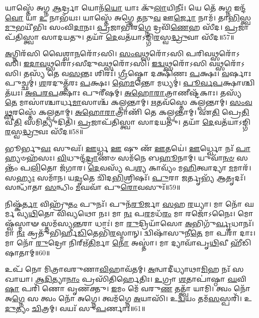𑌯𑌾𑌸𑍍𑌤𑍇᳴ 𑌅𑌗𑍍𑌨 \ul{𑌆}\-𑌰𑍍𑌦𑍍𑌰𑌾 𑌯𑍋𑌨᳴\-\ul{𑌯𑍋} 𑌯𑌾𑌃 𑌕𑍁᳴\-\ul{𑌲𑌾}\-𑌯𑌿𑌨𑍀𑌃॑। 
𑌯𑍇 𑌤𑍇᳴ 𑌅\-\ul{𑌗𑍍𑌨} 𑌇𑌨𑍍𑌦᳴\-\ul{𑌵𑍋} 𑌯𑌾 \ul{𑌉} 𑌨𑌾𑌭᳴𑌯𑌃। 
𑌯𑌾𑌸𑍍𑌤𑍇᳴ 𑌅𑌗𑍍𑌨𑍇 \ul{𑌤}\-𑌨𑍁\-\ul{𑌵} 𑌊\-\ul{𑌰𑍍𑌜𑍋} 𑌨𑌾𑌮᳴। 
𑌤𑌾\-\ul{𑌭𑌿}\-𑌸𑍍𑌤𑍍𑌵\-\ul{𑌮𑍁}\-𑌭𑌯𑍀᳴𑌭𑌿𑌃 𑌸𑌂𑌵𑌿\-\ul{𑌦𑌾}\-𑌨𑌃। 
\-\ul{𑌪𑍍𑌰}\-𑌜𑌾𑌭𑌿᳴𑌰\-\ul{𑌗𑍍𑌨𑍇} 𑌦𑍍𑌰𑌵𑌿᳴\-\ul{𑌣𑍇}\-𑌹 𑌸𑍀᳴𑌦। 
\-\ul{𑌪𑍍𑌰}\-𑌜𑌾𑌪᳴𑌤𑌿𑌸𑍍𑌤𑍍𑌵𑌾 𑌸𑌾𑌦𑌯𑌤𑍁। 
𑌤𑌯𑌾᳴ \ul{𑌦𑍇}\-𑌵𑌤᳴𑌯𑌾𑌽𑌙𑍍𑌗𑌿\-\ul{𑌰}\-𑌸𑍍𑌵\-\ul{𑌦𑍍𑌧𑍍𑌰𑍁}\-𑌵𑌾 𑌸𑍀᳴𑌦॥57॥
\anuvakamend

\-\ul{𑌅}\-𑌗𑍍𑌨𑌿𑌰᳴𑌸𑌿 𑌵𑍈𑌶𑍍𑌵𑌾\-\ul{𑌨}\-𑌰𑍋᳴𑌽𑌸𑌿। 
\-\ul{𑌸𑌂}\-\-\ul{𑌵}\-\-\ul{𑌥𑍍𑌸}\-𑌰𑍋᳴𑌽𑌸𑌿 𑌪𑌰𑌿𑌵\-\ul{𑌥𑍍𑌸}\-𑌰𑍋᳴𑌽𑌸𑌿। 
\-\ul{𑌇}\-\-\ul{𑌦𑌾}\-\-\ul{𑌵}\-\-\ul{𑌥𑍍𑌸}\-𑌰𑍋᳴𑌽𑌸𑍀𑌦𑍁𑌵\-\ul{𑌥𑍍𑌸}\-𑌰𑍋᳴𑌽𑌸𑌿। 
\-\ul{𑌇}\-\-\ul{𑌦𑍍𑌵}\-\-\ul{𑌥𑍍𑌸}\-𑌰𑍋᳴𑌽𑌸𑌿 𑌵\-\ul{𑌥𑍍𑌸}\-𑌰𑍋᳴𑌽𑌸𑌿। 
𑌤𑌸𑍍𑌯᳴ 𑌤𑍇 𑌵\-\ul{𑌸}\-𑌨𑍍𑌤𑌃  𑌶𑌿𑌰𑌃᳴। 
\-\ul{𑌗𑍍𑌰𑍀}\-𑌷𑍍𑌮𑍋 𑌦𑌕𑍍𑌷𑌿᳴𑌣𑌃 \ul{𑌪}\-𑌕𑍍𑌷𑌃। 
\-\ul{𑌵}\-𑌰𑍍\mbox{}𑌷𑌾𑌃 𑌪𑍁𑌚𑍍𑌛𑌮𑍍॑। 
\-\ul{𑌶}\-𑌰𑌦𑍁𑌤𑍍𑌤᳴𑌰𑌃 \ul{𑌪}\-𑌕𑍍𑌷𑌃। 
\-\ul{𑌹𑍇}\-\-\ul{𑌮}\-𑌨𑍍𑌤𑍋 𑌮𑌧𑍍𑌯𑌮𑍍॑। 
\-\ul{𑌪𑍂}\-\-\ul{𑌰𑍍𑌵}\-\-\ul{𑌪}\-𑌕𑍍𑌷𑌾𑌶𑍍𑌚𑌿𑌤᳴𑌯𑌃। 
\-\ul{𑌅}\-\-\ul{𑌪}\-\-\ul{𑌰}\-\-\ul{𑌪}\-𑌕𑍍𑌷𑌾𑌃 𑌪𑍁𑌰𑍀᳴𑌷𑌮𑍍। 
\-\ul{𑌅}\-\-\ul{𑌹𑍋}\-\-\ul{𑌰𑌾}\-𑌤𑍍𑌰𑌾𑌣𑍀𑌷𑍍𑌟᳴𑌕𑌾𑌃। 
𑌤𑌸𑍍𑌯᳴ \ul{𑌤𑍇} 𑌮𑌾𑌸𑌾॑𑌶𑍍𑌚𑌾𑌰𑍍𑌧\-\ul{𑌮𑌾}\-𑌸𑌾𑌶𑍍𑌚᳴ 𑌕𑌲𑍍𑌪𑌨𑍍𑌤𑌾𑌮𑍍। 
\-\ul{𑌋}\-𑌤𑌵᳴𑌸𑍍𑌤𑍇 𑌕𑌲𑍍𑌪𑌨𑍍𑌤𑌾𑌮𑍍। 
\-\ul{𑌸𑌂}\-\-\ul{𑌵}\-\-\ul{𑌥𑍍𑌸}\-𑌰𑌸𑍍𑌤𑍇᳴ 𑌕𑌲𑍍𑌪𑌤𑌾𑌮𑍍। 
\-\ul{𑌅}\-\-\ul{𑌹𑍋}\-\-\ul{𑌰𑌾}\-𑌤𑍍𑌰𑌾𑌣𑌿᳴ 𑌤𑍇 𑌕𑌲𑍍𑌪𑌨𑍍𑌤𑌾𑌮𑍍। 
𑌏\-\ul{𑌤𑌿} 𑌪𑍍𑌰𑍇\-\ul{𑌤𑌿} 𑌵𑍀\-\ul{𑌤𑌿} 𑌸𑌮𑌿𑌤𑍍𑌯𑍁𑌦𑌿𑌤𑌿᳴। 
\-\ul{𑌪𑍍𑌰}\-𑌜𑌾𑌪᳴𑌤𑌿𑌸𑍍𑌤𑍍𑌵𑌾 𑌸𑌾𑌦𑌯𑌤𑍁। 
𑌤𑌯𑌾᳴ \ul{𑌦𑍇}\-𑌵𑌤᳴𑌯𑌾𑌽𑌙𑍍𑌗𑌿\-\ul{𑌰}\-𑌸𑍍𑌵\-\ul{𑌦𑍍𑌧𑍍𑌰𑍁}\-𑌵𑌃 𑌸𑍀᳴𑌦॥58॥
\anuvakamend[𑌚𑌿𑌤᳴\-\ul{𑌯𑍋} 𑌨𑌵᳴ 𑌚]


𑌭𑍂𑌰𑍍𑌭𑍁\-\ul{𑌵𑌃} 𑌸𑍁𑌵𑌃᳴। 
\-\ul{𑌊}\-𑌰𑍍𑌧𑍍𑌵 \ul{𑌊} 𑌷𑍁 𑌣᳴ \ul{𑌊}\-𑌤𑌯𑍇॑। 
\-\ul{𑌊}\-𑌰𑍍𑌧𑍍𑌵𑍋 𑌨𑌃᳴ \ul{𑌪𑌾}\-𑌹𑍍𑌯𑍞𑌹᳴𑌸𑌃। 
\-\ul{𑌵𑌿}\-𑌧𑍁𑌨𑍍𑌦᳴\-\ul{𑌦𑍍𑌰𑌾}\-𑌣𑍞 𑌸𑌮᳴𑌨𑍇 𑌬\-\ul{𑌹𑍂}\-𑌨𑌾𑌮𑍍। 
𑌯𑍁𑌵𑌾᳴\-\ul{𑌨}\-\-\ul{𑍞} 𑌸𑌨𑍍𑌤𑌂᳴ 𑌪\-\ul{𑌲𑌿}\-𑌤𑍋 𑌜᳴𑌗𑌾𑌰। 
\-\ul{𑌦𑍇}\-𑌵𑌸𑍍𑌯᳴ 𑌪\-\ul{𑌶𑍍𑌯} 𑌕𑌾𑌵𑍍𑌯𑌂᳴ 𑌮\-\ul{𑌹𑌿}\-𑌤𑍍𑌵𑌾𑌦𑍍𑌯𑌾 \ul{𑌮}\-𑌮𑌾𑌰᳴। 
𑌸\-\ul{𑌹𑍍𑌯𑌃} 𑌸𑌮𑌾᳴𑌨। 
𑌯\-\ul{𑌦𑍃}\-𑌤𑍇 𑌚𑌿᳴𑌦\-\ul{𑌭𑌿}\-𑌶𑍍𑌰𑌿𑌷𑌃᳴। 
\-\ul{𑌪𑍁}\-𑌰𑌾 \ul{𑌜}\-𑌰𑍍𑌤𑍃𑌭𑍍𑌯᳴ \ul{𑌆}\-𑌤𑍃𑌦𑌃᳴। 
𑌸𑌨𑍍𑌧𑌾᳴𑌤𑌾 \ul{𑌸}\-𑌨𑍍𑌧𑌿𑌂 \ul{𑌮}\-𑌘𑌵𑌾᳴ 𑌪𑍁\-\ul{𑌰𑍋}\-𑌵𑌸𑍁𑌃᳴॥59॥

𑌨𑌿𑌷𑍍𑌕᳴\-\ul{𑌰𑍍𑌤𑌾} 𑌵𑌿𑌹𑍍𑌰𑍁᳴\-\ul{𑌤𑌂} 𑌪𑍁𑌨𑌃᳴। 
𑌪𑍁𑌨᳴\-\ul{𑌰𑍂}\-𑌰𑍍𑌜𑌾 \ul{𑌸}\-𑌹 \ul{𑌰}\-𑌯𑍍𑌯𑌾। 
𑌮𑌾 𑌨𑍋᳴ 𑌘𑌰𑍍𑌮 𑌵𑍍𑌯\-\ul{𑌥𑌿}\-𑌤𑍋 𑌵𑌿᳴𑌵𑍍𑌯𑌥𑍋 𑌨𑌃। 
𑌮𑌾 \ul{𑌨𑌃} 𑌪\-\ul{𑌰}\-𑌮𑌧᳴\-\ul{𑌰𑌂} 𑌮𑌾 𑌰𑌜𑍋᳴𑌽𑌨𑍈𑌃। 
𑌮𑍋𑌷𑍍𑌵᳴𑌸𑍍𑌮𑌾𑍟 𑌸𑍍𑌤𑌮᳴𑌸𑍍𑌯\-\ul{𑌨𑍍𑌤}\-𑌰𑌾 𑌧𑌾𑌃॑। 
𑌮𑌾 \ul{𑌰𑍁}\-𑌦𑍍𑌰𑌿𑌯𑌾᳴𑌸𑍋 \ul{𑌅}\-𑌭𑌿𑌗𑍁᳴\-\ul{𑌰𑍍𑌵𑍃}\-𑌧𑌾𑌨𑌃᳴। 
𑌮𑌾 \ul{𑌨𑌃} 𑌕𑍍𑌰𑌤𑍁᳴𑌭𑌿𑌰𑍍\mbox{}𑌹𑍀\-\ul{𑌡𑌿}\-𑌤𑍇𑌭𑌿᳴\-\ul{𑌰}\-𑌸𑍍𑌮𑌾𑌨𑍍। 
𑌦𑍍𑌵𑌿𑌷𑌾᳴𑌸𑍁𑌨𑍀\-\ul{𑌤𑍇} 𑌮𑌾 𑌪𑌰𑌾᳴ 𑌦𑌾𑌃। 
𑌮𑌾 𑌨𑍋᳴ \ul{𑌰𑍁}\-𑌦𑍍𑌰𑍋 𑌨𑌿𑌰𑍍\mbox{}𑌋᳴\-\ul{𑌤𑌿}\-𑌰𑍍𑌮𑌾 \ul{𑌨𑍋} 𑌅𑌸𑍍𑌤𑌾॑। 
𑌮𑌾 𑌦𑍍𑌯𑌾𑌵𑌾᳴𑌪𑍃\-\ul{𑌥𑌿}\-𑌵𑍀 𑌹𑍀᳴𑌡𑌿𑌷𑌾𑌤𑌾𑌮𑍍॥60॥

𑌉𑌪᳴ 𑌨𑍋 𑌮𑌿𑌤𑍍𑌰𑌾𑌵𑌰𑍁𑌣𑌾\-\ul{𑌵𑌿}\-𑌹𑌾𑌵᳴𑌤𑌮𑍍। 
\-\ul{𑌅}\-𑌨𑍍𑌵𑌾𑌦𑍀॑𑌧𑍍𑌯𑌾𑌥𑌾\-\ul{𑌮𑌿}\-𑌹 𑌨𑌃᳴ 𑌸𑌖𑌾𑌯𑌾। 
\-\ul{𑌆}\-\-\ul{𑌦𑌿}\-𑌤𑍍𑌯𑌾\-\ul{𑌨𑌾𑌂} 𑌪𑍍𑌰𑌸𑌿᳴𑌤𑌿𑌰𑍍\mbox{}\-\ul{𑌹𑍇}\-𑌤𑌿𑌃। 
\-\ul{𑌉}\-𑌗𑍍𑌰𑌾 \ul{𑌶}\-𑌤𑌾𑌪𑌾॑𑌷𑍍𑌠𑌾 \ul{𑌘}\-𑌵𑌿\-\ul{𑌷𑌾} 𑌪𑌰𑌿᳴ 𑌣𑍋 𑌵𑍃𑌣𑌕𑍍𑌤𑍁। 
\-\ul{𑌇}\-𑌮𑌂 𑌮𑍇᳴ 𑌵𑌰𑍁\-\ul{𑌣} 𑌤𑌤𑍍𑌤𑍍𑌵𑌾᳴ 𑌯𑌾𑌮𑌿। 
𑌤𑍍𑌵𑌂 𑌨𑍋᳴ 𑌅\-\ul{𑌗𑍍𑌨𑍇} 𑌸 𑌤𑍍𑌵𑌂 𑌨𑍋᳴ 𑌅𑌗𑍍𑌨𑍇। 
𑌤𑍍𑌵𑌮᳴𑌗𑍍𑌨𑍇 \ul{𑌅}\-𑌯𑌾𑌸𑌿᳴। 
𑌉\-\ul{𑌦𑍍𑌵}\-𑌯𑌂 𑌤𑌮᳴\-\ul{𑌸}\-𑌸𑍍𑌪𑌰𑌿᳴। 
𑌉\-\ul{𑌦𑍁}\-𑌤𑍍𑌯𑌂 \ul{𑌚𑌿}\-𑌤𑍍𑌰𑌮𑍍। 
𑌵𑌯𑌃᳴ 𑌸𑍁\-\ul{𑌪}\-𑌰𑍍𑌣𑌾𑌃॥61॥
\anuvakamend[\-\ul{𑌪𑍁}\-\-\ul{𑌰𑍋}\-𑌵𑌸𑍁᳴𑌰𑍍\mbox{}𑌹𑍀𑌡𑌿𑌷𑌾𑌤𑌾𑍞 𑌸𑍁\-\ul{𑌪}\-𑌰𑍍𑌣𑌾𑌃]


